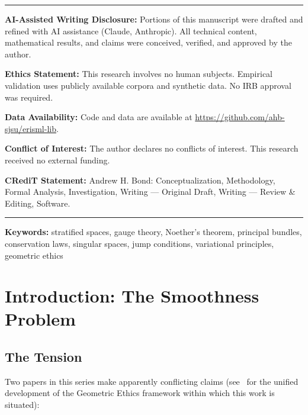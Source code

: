 \documentclass[11pt,a4paper]{article}
\begin{document}
\begin{titlepage}
\vfill

\noindent\rule{\linewidth}{0.4pt}
\small
\noindent\textbf{AI-Assisted Writing Disclosure:} Portions of this manuscript were drafted and refined with AI assistance (Claude, Anthropic). All technical content, mathematical results, and claims were conceived, verified, and approved by the author.

\noindent\textbf{Ethics Statement:} This research involves no human subjects. Empirical validation uses publicly available corpora and synthetic data. No IRB approval was required.

\noindent\textbf{Data Availability:} Code and data are available at \url{https://github.com/ahb-sjsu/erisml-lib}.

\noindent\textbf{Conflict of Interest:} The author declares no conflicts of interest. This research received no external funding.

\noindent\textbf{CRediT Statement:} Andrew H. Bond: Conceptualization, Methodology, Formal Analysis, Investigation, Writing --- Original Draft, Writing --- Review \& Editing, Software.
\noindent\rule{\linewidth}{0.4pt}
\normalsize

\end{titlepage}

\noindent\textbf{Keywords:} stratified spaces, gauge theory, Noether's theorem, principal bundles, conservation laws, singular spaces, jump conditions, variational principles, geometric ethics

\tableofcontents

\section{Introduction: The Smoothness Problem}

\subsection{The Tension}

Two papers in this series make apparently conflicting claims (see~\cite{bond2026ge} for the unified development of the Geometric Ethics framework within which this work is situated):
\end{document}
